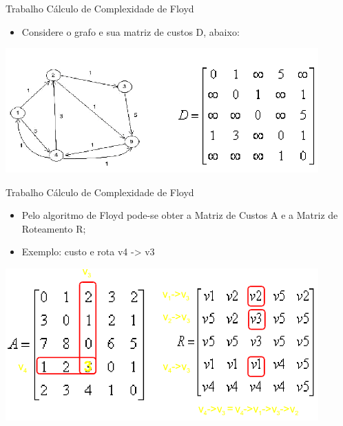 \documentclass[12pt,table,xcolor={dvipsnames}]{beamer}
\begin{document}
\begin{frame}[fragile]{Trabalho Cálculo de Complexidade de Floyd}
\begin{itemize}
\item Considere o grafo e sua matriz de custos D, abaixo:
\end{itemize}
\begin{center}
\includegraphics[width=0.9\textwidth]{floyd1.png} 
\end{center}   
\end{frame}

\begin{frame}[fragile]{Trabalho Cálculo de Complexidade de Floyd}
\begin{itemize}
\item Pelo algoritmo de Floyd pode-se obter a Matriz de Custos A e a Matriz de Roteamento R;
\item Exemplo: custo e rota v4 -> v3
\end{itemize}
\begin{center}
\includegraphics[width=0.9\textwidth]{floyd2.png} 
\end{center}   
\end{frame}
\end{document}
